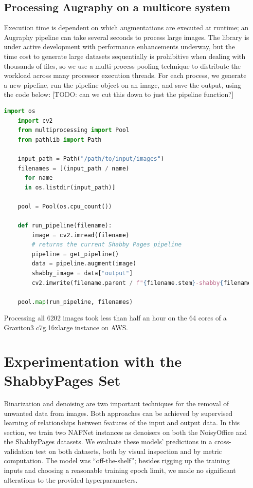 \documentclass[runningheads]{llncs}
\begin{document}
\subsection{Processing Augraphy on a multicore system}
Execution time is dependent on which augmentations are executed at runtime; an Augraphy pipeline can take several seconds to process large images.
The library is under active development with performance enhancements underway, but the time cost to generate large datasets sequentially is prohibitive when dealing with thousands of files, so we use a multi-process pooling technique to distribute the workload across many processor execution threads.
For each process, we generate a new pipeline, run the pipeline object on an image, and save the output, using the code below: [TODO: can we cut this down to just the pipeline function?]

\begin{lstlisting}[language=Python]
    import os
    import cv2
    from multiprocessing import Pool
    from pathlib import Path

    input_path = Path("/path/to/input/images")
    filenames = [(input_path / name)
      for name
      in os.listdir(input_path)]

    pool = Pool(os.cpu_count())

    def run_pipeline(filename):
        image = cv2.imread(filename)
        # returns the current Shabby Pages pipeline
        pipeline = get_pipeline()
        data = pipeline.augment(image)
        shabby_image = data["output"]
        cv2.imwrite(filename.parent / f"{filename.stem}-shabby{filename.suffix}")

    pool.map(run_pipeline, filenames)

\end{lstlisting}

Processing all 6202 images took less than half an hour on the 64 cores of a Graviton3 c7g.16xlarge instance on AWS.

\section{Experimentation with the ShabbyPages Set}
Binarization and denoising are two important techniques for the removal of unwanted data from images.
Both approaches can be achieved by supervised learning of relationships between features of the input and output data.
In this section, we train two NAFNet \cite{ref_nafnet} instances as denoisers on both the NoisyOffice and the ShabbyPages datasets. We evaluate these models' predictions in a cross-validation test on both datasets, both by visual inspection and by metric computation.
The model was ``off-the-shelf''; besides rigging up the training inputs and choosing a reasonable training epoch limit, we made no significant alterations to the provided hyperparameters.
\end{document}
